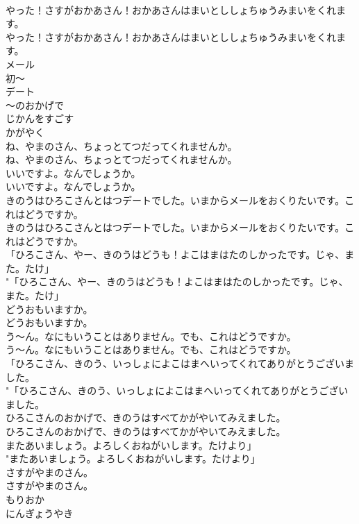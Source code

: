 \documentclass[8pt]{extreport}
\begin{document}
\begin{CJK}{UTF8}{min}
\\	やった！さすがおかあさん！おかあさんはまいとししょちゅうみまいをくれます。	
\\	やった！さすがおかあさん！おかあさんはまいとししょちゅうみまいをくれます。 
\\	メール
\\	初～
\\	デート
\\	～のおかげで
\\	じかんをすごす
\\	かがやく
\\	ね、やまのさん、ちょっとてつだってくれませんか。	
\\	ね、やまのさん、ちょっとてつだってくれませんか。 
\\	いいですよ。なんでしょうか。	
\\	いいですよ。なんでしょうか。 
\\	きのうはひろこさんとはつデートでした。いまからメールをおくりたいです。これはどうですか。	
\\	きのうはひろこさんとはつデートでした。いまからメールをおくりたいです。これはどうですか。 
\\	「ひろこさん、やー、きのうはどうも！よこはまはたのしかったです。じゃ、また。たけ」	
\\	"「ひろこさん、やー、きのうはどうも！よこはまはたのしかったです。じゃ、また。たけ」 
\\	どうおもいますか。	
\\	どうおもいますか。 
\\	う〜ん。なにもいうことはありません。でも、これはどうですか。	
\\	う〜ん。なにもいうことはありません。でも、これはどうですか。 
\\	「ひろこさん、きのう、いっしょによこはまへいってくれてありがとうございました。	
\\	"「ひろこさん、きのう、いっしょによこはまへいってくれてありがとうございました。 
\\	ひろこさんのおかげで、きのうはすべてかがやいてみえました。	
\\	ひろこさんのおかげで、きのうはすべてかがやいてみえました。 
\\	またあいましょう。よろしくおねがいします。たけより」	
\\	"またあいましょう。よろしくおねがいします。たけより」 
\\	さすがやまのさん。	
\\	さすがやまのさん。 
\\	もりおか
\\	にんぎょうやき

\end{CJK}
\end{document}
